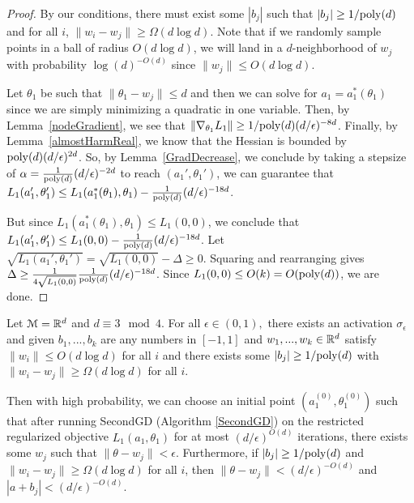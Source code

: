 \begin{proof}
By our conditions, there must exist some $|b_j|$ such that $|b_j| \geq 1/\mathrm{poly}(d)$ and for all $i$, $\|w_i - w_j\| \geq \Omega(d\log d)$. Note that if we randomly sample points in a ball of radius $O(d\log d)$, we will land in a $d$-neighborhood of $w_j$ with probability $\log(d)^{-O(d)}$ since $\|w_j\|\leq O(d\log d)$. 

Let $\theta_1$ be such that $\|\theta_1 - w_j \| \leq d$ and then we can solve for $a_1 = a_1^*(\theta_1)$ since we are simply minimizing a quadratic in one variable. Then, by Lemma~\ref{nodeGradient}, we see that $\|\nabla_{\theta_1}L_1 \| \geq 1/\mathrm{poly}(d)(d/\epsilon)^{-8d}$. Finally, by Lemma~\ref{almostHarmReal}, we know that the Hessian is bounded by $\mathrm{poly}(d)(d/\epsilon)^{2d }$. So, by Lemma~\ref{GradDecrease}, we conclude by taking a stepsize of $\alpha = \frac{1}{\mathrm{poly}(d)}(d/\epsilon)^{-2d}$ to reach $(a_1',\theta_1')$, we can guarantee that $L_1(a_1', \theta_1') \leq L_1 (a_1^*(\theta_1), \theta_1) - \frac{1}{\mathrm{poly}(d)} (d/\epsilon)^{ -18d}$.

But since $L_1(a_1^*(\theta_1),\theta_1)\leq L_1(0,0)$, we conclude that $L_1(a_1', \theta_1') \leq L_1(0,0) -  \frac{1}{\mathrm{poly}(d)} (d/\epsilon)^{ -18d}$. Let $\sqrt{L_1(a_1', \theta_1')} = \sqrt{L_1(0,0)} - \Delta \geq 0$. Squaring and rearranging gives $\Delta \geq \frac{1}{4\sqrt{L_1( 0, 0)}}  \frac{1}{\mathrm{poly}(d)}(d/\epsilon)^{ -18d} $. Since $L_1(0,0) \leq O(k) = O(\mathrm{poly}(d))$, we are done. 

\end{proof}
%
\begin{lemma}\label{nodewiseSGD}
Let $\mathcal{M} = {\mathbb{R}}^{d}$ and $d\equiv 3 \mod 4$. For all $\epsilon \in (0,1),$ there exists an activation $\sigma_\epsilon$ and given $b_1,...,b_k$ are any numbers in $[-1,1]$ and $w_1,...,w_k \in {\mathbb{R}}^d$ satisfy $\|w_i\|\leq O(d\log d)$ for all $i$ and there exists some $|b_j| \geq 1/\mathrm{poly}(d)$ with $\|w_i - w_j\| \geq \Omega(d\log d)$ for all $i$.

Then with high probability, we can choose an initial point $(a_1^{(0)}, \theta_1^{(0)})$ such that after running SecondGD (Algorithm \ref{SecondGD}) on the restricted regularized objective $L_1(a_1,\theta_1)$ for at most $(d/\epsilon)^{O(d)}$ iterations, there exists some $w_j$ such that $\|\theta - w_j\| < \epsilon$. Furthermore, if $|b_j| \geq 1/\mathrm{poly}(d)$ and $\|w_i - w_j\| \geq \Omega(d\log d)$ for all $i$, then $\|\theta - w_j\| < (d/\epsilon)^{-O(d)}$ and $|a + b_j| < (d/\epsilon)^{-O(d)}$.
\end{lemma}


